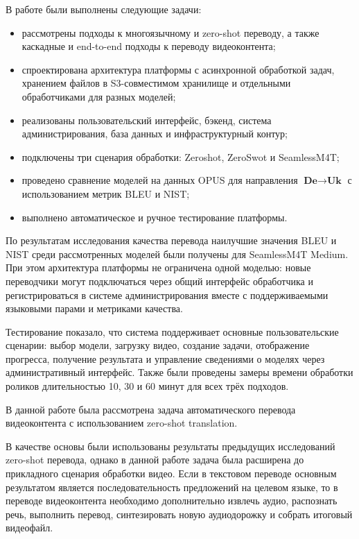 \documentclass[a4paper,article,14pt]{extarticle}
\begin{document}
В работе были выполнены следующие задачи:
\begin{itemize}
  \item рассмотрены подходы к многоязычному и zero-shot переводу, а также каскадные и end-to-end подходы к переводу видеоконтента;
  \item спроектирована архитектура платформы с асинхронной обработкой задач, хранением файлов в S3-совместимом хранилище и отдельными обработчиками для разных моделей;
  \item реализованы пользовательский интерфейс, бэкенд, система администрирования, база данных и инфраструктурный контур;
  \item подключены три сценария обработки: Zeroshot, ZeroSwot и SeamlessM4T;
  \item проведено сравнение моделей на данных OPUS для направления $\textbf{De}\!\rightarrow\!\textbf{Uk}$ с использованием метрик BLEU и NIST;
  \item выполнено автоматическое и ручное тестирование платформы.
\end{itemize}

По результатам исследования качества перевода наилучшие значения BLEU и NIST среди рассмотренных моделей были получены для SeamlessM4T Medium. При этом архитектура платформы не ограничена одной моделью: новые переводчики могут подключаться через общий интерфейс обработчика и регистрироваться в системе администрирования вместе с поддерживаемыми языковыми парами и метриками качества.

Тестирование показало, что система поддерживает основные пользовательские сценарии: выбор модели, загрузку видео, создание задачи, отображение прогресса, получение результата и управление сведениями о моделях через административный интерфейс. Также были проведены замеры времени обработки роликов длительностью 10, 30 и 60 минут для всех трёх подходов.

\newpage
{}

В данной работе была рассмотрена задача автоматического перевода видеоконтента с использованием zero-shot translation.

В качестве основы были использованы результаты предыдущих исследований zero-shot перевода, однако в данной работе задача была расширена до прикладного сценария обработки видео. Если в текстовом переводе основным результатом является последовательность предложений на целевом языке, то в переводе видеоконтента необходимо дополнительно извлечь аудио, распознать речь, выполнить перевод, синтезировать новую аудиодорожку и собрать итоговый видеофайл.
\end{document}
